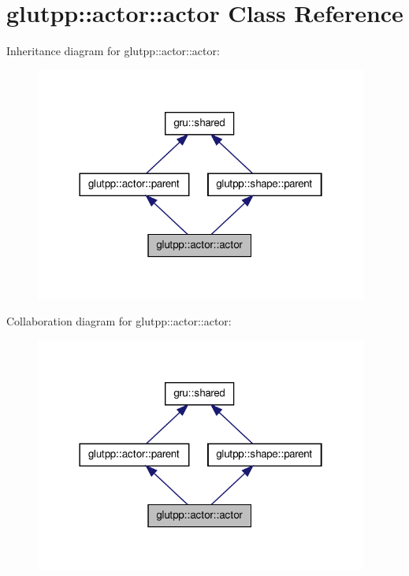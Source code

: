 \hypertarget{classglutpp_1_1actor_1_1actor}{\section{glutpp\-:\-:actor\-:\-:actor \-Class \-Reference}
\label{classglutpp_1_1actor_1_1actor}
}


\-Inheritance diagram for glutpp\-:\-:actor\-:\-:actor\-:
\nopagebreak
\begin{figure}[H]
\begin{center}
\leavevmode
\includegraphics[width=310pt]{classglutpp_1_1actor_1_1actor__inherit__graph}
\end{center}
\end{figure}


\-Collaboration diagram for glutpp\-:\-:actor\-:\-:actor\-:
\nopagebreak
\begin{figure}[H]
\begin{center}
\leavevmode
\includegraphics[width=310pt]{classglutpp_1_1actor_1_1actor__coll__graph}
\end{center}
\end{figure}
